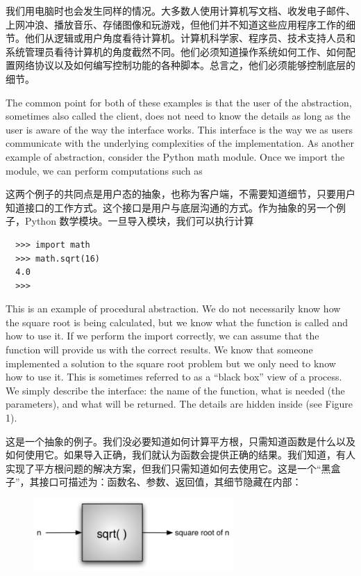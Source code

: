 我们用电脑时也会发生同样的情况。大多数人使用计算机写文档、收发电子邮件、上网冲浪、播放音乐、存储图像和玩游戏，但他们并不知道这些应用程序工作的细节。他们从逻辑或用户角度看待计算机。计算机科学家、程序员、技术支持人员和系统管理员看待计算机的角度截然不同。他们必须知道操作系统如何工作、如何配置网络协议以及如何编写控制功能的各种脚本。总言之，他们必须能够控制底层的细节。

The common point for both of these examples is that the user of the abstraction, sometimes also called the client, does not need to know the details as long as the user is aware of the way the interface works. This interface is the way we as users communicate with the underlying complexities of the implementation. As another example of abstraction, consider the Python math module. Once we import the module, we can perform computations such as

这两个例子的共同点是用户态的抽象，也称为客户端，不需要知道细节，只要用户知道接口的工作方式。这个接口是用户与底层沟通的方式。作为抽象的另一个例子，Python 数学模块。一旦导入模块，我们可以执行计算
\begin{lstlisting}
  >>> import math
  >>> math.sqrt(16)
  4.0
  >>>
\end{lstlisting}

This is an example of procedural abstraction. We do not necessarily know how the square root is being calculated, but we know what the function is called and how to use it. If we perform the import correctly, we can assume that the function will provide us with the correct results. We know that someone implemented a solution to the square root problem but we only need to know how to use it. This is sometimes referred to as a “black box” view of a process. We simply describe the interface: the name of the function, what is needed (the parameters), and what will be returned. The details are hidden inside (see Figure 1).

这是一个抽象的例子。我们没必要知道如何计算平方根，只需知道函数是什么以及如何使用它。如果导入正确，我们就认为函数会提供正确的结果。我们知道，有人实现了平方根问题的解决方案，但我们只需知道如何去使用它。这是一个“黑盒子”，其接口可描述为：函数名、参数、返回值，其细节隐藏在内部：
\begin{figure}[htbp]
  \centering
  \includegraphics[width=3in]{images/blackbox.png}
\end{figure}

